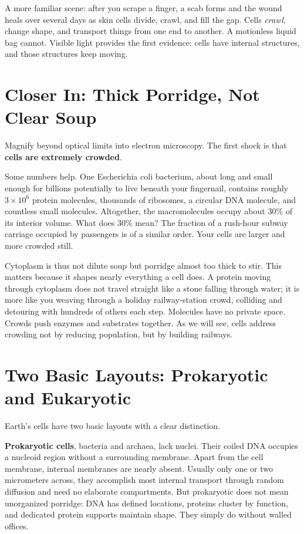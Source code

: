 A more familiar scene: after you scrape a finger, a scab forms and the wound heals over several days as skin cells divide, crawl, and fill the gap. Cells \emph{crawl}, change shape, and transport things from one end to another. A motionless liquid bag cannot. Visible light provides the first evidence: cells have internal structures, and those structures keep moving.

\section{Closer In: Thick Porridge, Not Clear Soup}

Magnify beyond optical limits into electron microscopy. The first shock is that \textbf{cells are extremely crowded}.

Some numbers help. One Escherichia coli bacterium, about  long and small enough for billions potentially to live beneath your fingernail, contains roughly $3\times10^{6}$ protein molecules, thousands of ribosomes, a circular DNA molecule, and countless small molecules. Altogether, the macromolecules occupy about $30\%$ of its interior volume. What does $30\%$ mean? The fraction of a rush-hour subway carriage occupied by passengers is of a similar order. Your cells are larger and more crowded still.

Cytoplasm is thus not dilute soup but porridge almost too thick to stir. This matters because it shapes nearly everything a cell does. A protein moving through cytoplasm does not travel straight like a stone falling through water; it is more like you weaving through a holiday railway-station crowd, colliding and detouring with hundreds of others each step. Molecules have no private space. Crowds push enzymes and substrates together. As we will see, cells address crowding not by reducing population, but by building railways.

\section{Two Basic Layouts: Prokaryotic and Eukaryotic}

Earth's cells have two basic layouts with a clear distinction.

\textbf{Prokaryotic cells}, bacteria and archaea, lack nuclei. Their coiled DNA occupies a nucleoid region without a surrounding membrane. Apart from the cell membrane, internal membranes are nearly absent. Usually only one or two micrometers across, they accomplish most internal transport through random diffusion and need no elaborate compartments. But prokaryotic does not mean unorganized porridge: DNA has defined locations, proteins cluster by function, and dedicated protein supports maintain shape. They simply do without walled offices.

